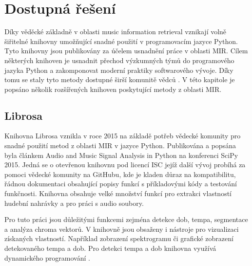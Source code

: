 






\section{Dostupná řešení} \label{sec:Dostupna_reseni}
    Díky věděcké základně v oblasti music information retrieval vznikají volně šiřitelné knihovny umožňující snadné použití v programovacím jazyce Python. Tyto knihovny jsou publikovány za účelem usnadnění práce v oblasti \acs{MIR}. Cílem některých knihoven je usnadnit přechod výzkumných týmů do programového jazyka Python a zakomponovat moderní praktiky softwarového vývoje. Díky tomu se staly tyto metody dostupné širší komunitě vědců \cite{Librosa}. V této kapitole je popsáno několik rozšířených knihoven poskytující metody z oblasti \acs{MIR}.

\subsection{Librosa} \label{sec:Librosa}
    Knihovna Librosa vznikla v roce 2015 na základě potřeb vědecké komunity pro snadné použití metod z oblasti \acs{MIR} v jazyce Python.
    Publikována a popsána byla článkem Audio and Music Signal Analysis in Python \cite{Librosa} na konferenci SciPy 2015.
    Jedná se o otevřenou knihovnu pod licencí ISC jejíž další vývoj probíhá za pomoci vědecké komunity na GitHubu, kde je kladen důraz na kompatibilitu, řádnou dokumentaci obsahující popisy funkcí s příkladovými kódy a testování funkčnosti. Knihovna obsahuje velké množství funkcí pro extrakci vlastností hudební nahrávky a pro práci s audio soubory.

    Pro tuto práci jsou důležitými funkcemi zejména detekce dob, tempa, segmentace a analýza chroma vektorů. V knihovně jsou obsaženy i nástroje pro vizualizaci získaných vlastností. Například zobrazení spektrogramu či grafické zobrazení detekovaného tempa a dob. Pro detekci tempa a dob knihovna využívá dynamického programování \cite{Beat_tracking_by_dynamic_programing}.


